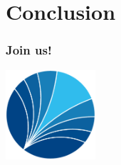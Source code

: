 \section{Conclusion}
\begin{frame}\frametitle{Join us!}\vspace{1.25cm}

  \begin{multicols}{2}

      \hspace{1.3cm}\includegraphics[width=0.25\textwidth]{material/ose-logo-no-type-rgb.pdf}


        \columnbreak



\end{multicols}
\end{frame}
